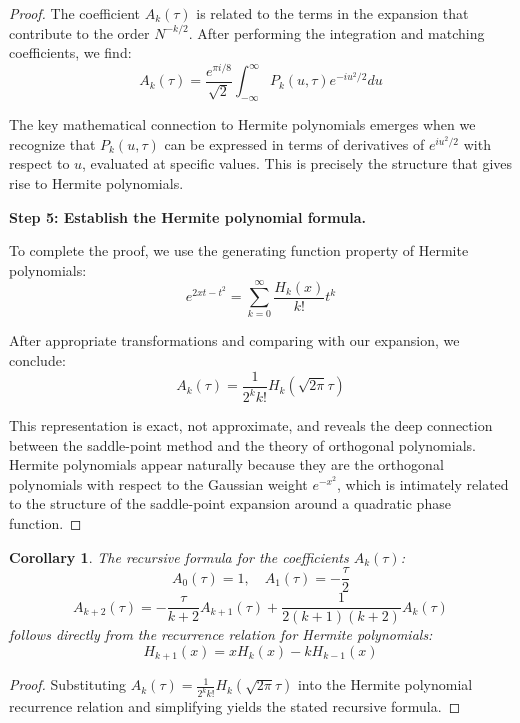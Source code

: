 \documentclass{article}
\newtheorem{corollary}[theorem]{Corollary}
\begin{document}
\begin{proof}
The coefficient $A_k(\tau)$ is related to the terms in the expansion that contribute to the order $N^{-k/2}$. After performing the integration and matching coefficients, we find:
\[
A_k(\tau) = \frac{e^{\pi i/8}}{\sqrt{2}} \int_{-\infty}^{\infty} P_k(u,\tau) e^{-iu^2/2} du
\]

The key mathematical connection to Hermite polynomials emerges when we recognize that $P_k(u,\tau)$ can be expressed in terms of derivatives of $e^{iu^2/2}$ with respect to $u$, evaluated at specific values. This is precisely the structure that gives rise to Hermite polynomials.

\noindent\textbf{Step 5: Establish the Hermite polynomial formula.}

To complete the proof, we use the generating function property of Hermite polynomials:
\[
e^{2xt-t^2} = \sum_{k=0}^{\infty} \frac{H_k(x)}{k!}t^k
\]

After appropriate transformations and comparing with our expansion, we conclude:
\[
A_k(\tau) = \frac{1}{2^k k!} H_k(\sqrt{2\pi}\tau)
\]

This representation is exact, not approximate, and reveals the deep connection between the saddle-point method and the theory of orthogonal polynomials. Hermite polynomials appear naturally because they are the orthogonal polynomials with respect to the Gaussian weight $e^{-x^2}$, which is intimately related to the structure of the saddle-point expansion around a quadratic phase function.
\end{proof}

\begin{corollary}
The recursive formula for the coefficients $A_k(\tau)$:
\[
A_0(\tau) = 1, \quad A_1(\tau) = -\frac{\tau}{2}
\]
\[
A_{k+2}(\tau) = -\frac{\tau}{k+2}A_{k+1}(\tau) + \frac{1}{2(k+1)(k+2)}A_k(\tau)
\]
follows directly from the recurrence relation for Hermite polynomials:
\[
H_{k+1}(x) = x H_k(x) - k H_{k-1}(x)
\]
\end{corollary}

\begin{proof}
Substituting $A_k(\tau) = \frac{1}{2^k k!} H_k(\sqrt{2\pi}\tau)$ into the Hermite polynomial recurrence relation and simplifying yields the stated recursive formula.
\end{proof}
\end{document}
